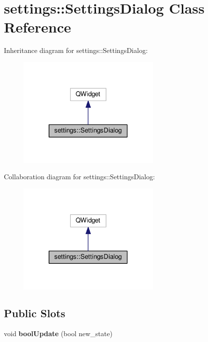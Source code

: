 \hypertarget{classsettings_1_1SettingsDialog}{}\section{settings\+:\+:Settings\+Dialog Class Reference}
\label{classsettings_1_1SettingsDialog}


Inheritance diagram for settings\+:\+:Settings\+Dialog\+:\nopagebreak
\begin{figure}[H]
\begin{center}
\leavevmode
\includegraphics[width=201pt]{classsettings_1_1SettingsDialog__inherit__graph}
\end{center}
\end{figure}


Collaboration diagram for settings\+:\+:Settings\+Dialog\+:\nopagebreak
\begin{figure}[H]
\begin{center}
\leavevmode
\includegraphics[width=201pt]{classsettings_1_1SettingsDialog__coll__graph}
\end{center}
\end{figure}
\subsection*{Public Slots}
\begin{DoxyCompactItemize}
\item 
void {\bfseries bool\+Update} (bool new\+\_\+state)\hypertarget{classsettings_1_1SettingsDialog_aa1333ba5f02c191c1c7c197955946dd5}{}\label{classsettings_1_1SettingsDialog_aa1333ba5f02c191c1c7c197955946dd5}

\end{DoxyCompactItemize}
